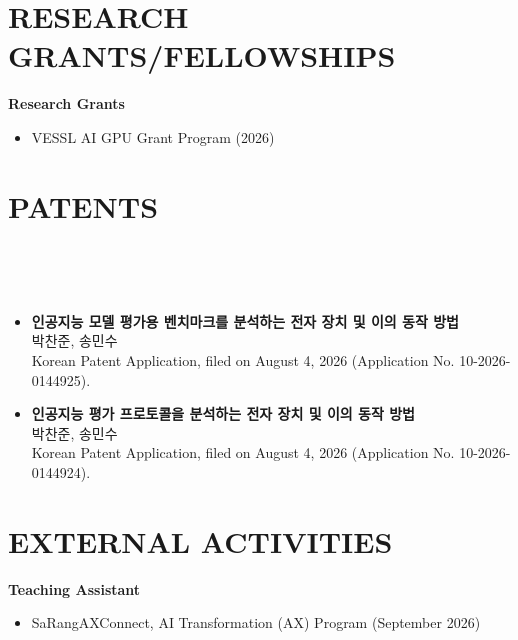 \documentclass[10pt,a4paper]{article}
\newcommand{\krfont}{}           %
\newcommand{\kr}[1]{{\krfont #1}}
\let\krfont\notoserifkr
\newcommand{\seclabel}[1]{\section*{\uppercase{#1}}}
\begin{document}
\seclabel{Research Grants/Fellowships}
\textbf{Research Grants}
\begin{itemize}
    \item \small{VESSL AI GPU Grant Program (2026)}
\end{itemize}

\seclabel{Patents}
\par\vspace{0.4em}
\\[-0.6em]
\noindent{\color{gray}\rule{\linewidth}{0.4pt}}
\par\vspace{0.4em}
\\[-0.6em]
\noindent{\color{gray}\rule{\linewidth}{0.4pt}}
\begin{itemize}
    \item \small{\textbf{\kr{인공지능 모델 평가용 벤치마크를 분석하는 전자 장치 및 이의 동작 방법}} \\
    \kr{박찬준, 송민수} \\
    Korean Patent Application, filed on August 4, 2026 (Application No. 10-2026-0144925).} \vspace{0.4em}

    \item \small{\textbf{\kr{인공지능 평가 프로토콜을 분석하는 전자 장치 및 이의 동작 방법}} \\
    \kr{박찬준, 송민수} \\
    Korean Patent Application, filed on August 4, 2026 (Application No. 10-2026-0144924).}
\end{itemize}

\seclabel{External Activities}
\textbf{Teaching Assistant}
\begin{itemize}
    \item \small{SaRangAXConnect, AI Transformation (AX) Program (September 2026)}
\end{itemize}
\end{document}
